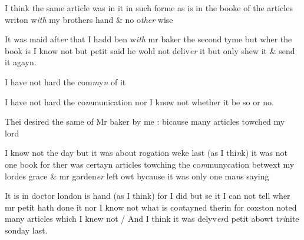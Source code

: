\documentclass[12pt, a4paper]{book}
\begin{document}
				\marginpar[\vspace{0.5cm}{\textcolor{Gray}{22}}]{}
			

		\ifthenelse{\isodd{\thepage}}
		{\reversemarginpar}
		{\normalmarginpar}
		I think the same article was in it in such forme as is in the
booke of the articles writon w\textit{ith} my brothers hand \& no o\textit{ther }wise

				\marginpar[\vspace{0.5cm}{\textcolor{Gray}{23}}]{}
			

		\ifthenelse{\isodd{\thepage}}
		{\reversemarginpar}
		{\normalmarginpar}
		It was maid aft\textit{er} that I hadd ben w\textit{ith} mr baker the second tyme
but wher the book is I know not but petit said he wold not 
deliv\textit{er} it but only shew it \& send it agayn.

				\marginpar[\vspace{0.5cm}{\textcolor{Gray}{24}}]{}
			

		\ifthenelse{\isodd{\thepage}}
		{\reversemarginpar}
		{\normalmarginpar}
		I have not hard the com\textit{m}y\textit{n} of it

				\marginpar[\vspace{0.5cm}{\textcolor{Gray}{25}}]{}
			

		\ifthenelse{\isodd{\thepage}}
		{\reversemarginpar}
		{\normalmarginpar}
		I have not hard the co\textit{m}munication nor I know not whether it 
be so or no.

				\marginpar[\vspace{0.5cm}{\textcolor{Gray}{[2]6.}}]{}
			
		\ifthenelse{\isodd{\thepage}}
		{\reversemarginpar}
		{\normalmarginpar}
		Thei desired the same of Mr baker by me : bicause many articles
towched my lord

				\marginpar[\vspace{0.5cm}{\textcolor{Gray}{[27]}}]{}
			
		\ifthenelse{\isodd{\thepage}}
		{\reversemarginpar}
		{\normalmarginpar}
		I know not the day but it was about rogation weke last (as I thi\textit{n}k)
it was not one book for ther was certayn articles towching the
co\textit{m}munycation betwext my lordes grace  \& mr garden\textit{er} left owt
bycause it was only one ma\textit{n}s saying

				\marginpar[\vspace{0.5cm}{\textcolor{Gray}{[28]}}]{}
			
		\ifthenelse{\isodd{\thepage}}
		{\reversemarginpar}
		{\normalmarginpar}
		It is in doctor london is hand (as I think) for I did but se it
I can not tell wher mr petit hath done it nor I know not what
is co\textit{n}tayned therin for coxston noted many articles which I knew
not / And I think it was delyv\textit{er}d petit abowt t\textit{ri}nite sonday last.
 	
\end{document}
